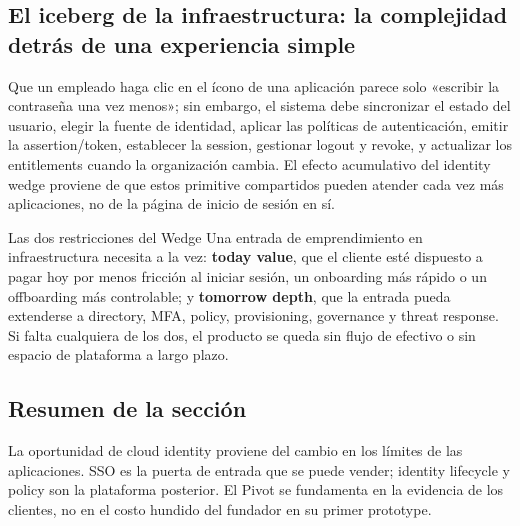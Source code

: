 
\subsection{El iceberg de la infraestructura: la complejidad detrás de una experiencia simple}

Que un empleado haga clic en el ícono de una aplicación parece solo «escribir la contraseña una vez menos»; sin embargo, el sistema debe sincronizar el estado del usuario, elegir la fuente de identidad, aplicar las políticas de autenticación, emitir la assertion/token, establecer la session, gestionar logout y revoke, y actualizar los entitlements cuando la organización cambia. El efecto acumulativo del identity wedge proviene de que estos primitive compartidos pueden atender cada vez más aplicaciones, no de la página de inicio de sesión en sí.

\begin{importantbox}{Las dos restricciones del Wedge}
Una entrada de emprendimiento en infraestructura necesita a la vez: \textbf{today value}, que el cliente esté dispuesto a pagar hoy por menos fricción al iniciar sesión, un onboarding más rápido o un offboarding más controlable; y \textbf{tomorrow depth}, que la entrada pueda extenderse a directory, MFA, policy, provisioning, governance y threat response. Si falta cualquiera de los dos, el producto se queda sin flujo de efectivo o sin espacio de plataforma a largo plazo.
\end{importantbox}

\subsection{Resumen de la sección}

La oportunidad de cloud identity proviene del cambio en los límites de las aplicaciones. SSO es la puerta de entrada que se puede vender; identity lifecycle y policy son la plataforma posterior. El Pivot se fundamenta en la evidencia de los clientes, no en el costo hundido del fundador en su primer prototype.
